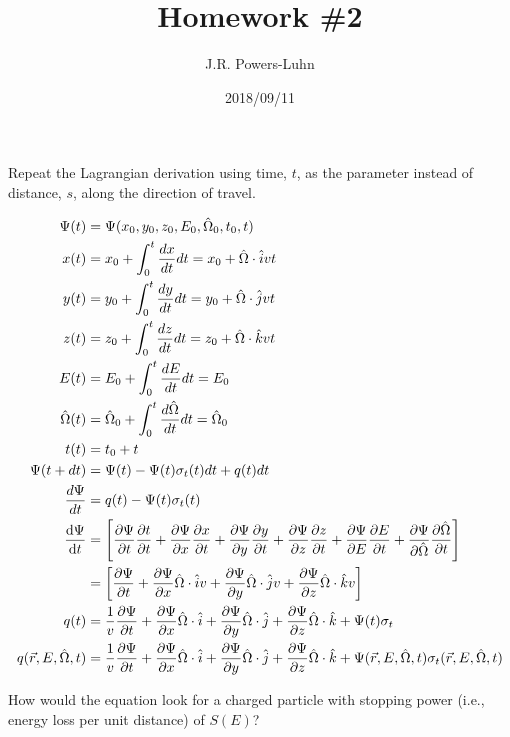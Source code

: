 \documentclass{hw}
\author{J.R. Powers-Luhn}
\date{2018/09/11}
\title{Homework \#2}
\begin{document}
\problem{}
    Repeat the Lagrangian derivation using time, $t$, as the parameter instead of distance, $s$, along the direction of travel.

\solution
    \begin{align*}
    	\Psi (t) &= \Psi(x_0, y_0, z_0, E_0, \hat{\Omega}_0, t_0, t) \\
    	x(t) &= x_0 + \int_0^t \frac{dx}{dt} dt = x_0 + \hat{\Omega} \cdot \hat{i} v t \\
    	y(t) &= y_0 + \int_0^t \frac{dy}{dt} dt = y_0 + \hat{\Omega} \cdot \hat{j} v t \\
    	z(t) &= z_0 + \int_0^t \frac{dz}{dt} dt = z_0 + \hat{\Omega} \cdot \hat{k} v t \\
    	E(t) &= E_0 + \int_0^t \frac{dE}{dt} dt = E_0 \\
    	\hat{\Omega}(t) &= \hat{\Omega}_0 + \int_0^t \frac{d\hat{\Omega}}{dt} dt = \hat{\Omega}_0 \\
    	t(t) &= t_0 + t \\
    	\Psi(t + dt) &= \Psi(t) - \Psi(t) \sigma_t(t) dt + q(t)dt \\
    	\frac{d\Psi}{dt} &= q(t) - \Psi(t) \sigma_t(t) \\
    	\dv{\Psi}{t} &= \left[ \pdv{\Psi}{t} \pdv{t}{t} + \pdv{\Psi}{x} \pdv{x}{t} + \pdv{\Psi}{y} \pdv{y}{t} + \pdv{\Psi}{z} \pdv{z}{t} + \pdv{\Psi}{E} \pdv{E}{t} + \pdv{\Psi}{\hat{\Omega}} \pdv{\hat{\Omega}}{t} \right] \\
    	&= \left[ \pdv{\Psi}{t} + \pdv{\Psi}{x} \hat{\Omega} \cdot \hat{i} v + \pdv{\Psi}{y} \hat{\Omega} \cdot \hat{j} v + \pdv{\Psi}{z} \hat{\Omega} \cdot \hat{k} v \right] \\
    	q(t) &= \frac{1}{v} \pdv{\Psi}{t} + \pdv{\Psi}{x} \hat{\Omega} \cdot \hat{i} + \pdv{\Psi}{y} \hat{\Omega} \cdot \hat{j} + \pdv{\Psi}{z} \hat{\Omega} \cdot \hat{k} + \Psi(t) \sigma_t \\
    	q(\vec{r}, E, \hat{\Omega}, t) &= \frac{1}{v} \pdv{\Psi}{t} + \pdv{\Psi}{x} \hat{\Omega} \cdot \hat{i} + \pdv{\Psi}{y} \hat{\Omega} \cdot \hat{j} + \pdv{\Psi}{z} \hat{\Omega} \cdot \hat{k} + \Psi(\vec{r}, E, \hat{\Omega}, t) \sigma_t(\vec{r}, E, \hat{\Omega}, t)
    \end{align*}

\problem{}
    How would the equation look for a charged particle with stopping power (i.e., energy loss per unit distance) of $S(E)$?
\end{document}
